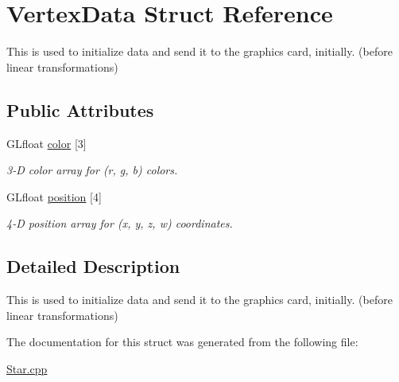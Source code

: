 \hypertarget{struct_vertex_data}{}\section{Vertex\+Data Struct Reference}
\label{struct_vertex_data}


This is used to initialize data and send it to the graphics card, initially. (before linear transformations)  


\subsection*{Public Attributes}
\begin{DoxyCompactItemize}
\item 
\mbox{\label{struct_vertex_data_a305475959e3c612d733b423f55f16709}} 
G\+Lfloat \hyperlink{struct_vertex_data_a305475959e3c612d733b423f55f16709}{color} \mbox{[}3\mbox{]}
\begin{DoxyCompactList}\small\item\em 3-\/D color array for (r, g, b) colors. \end{DoxyCompactList}\item 
\mbox{\label{struct_vertex_data_ad1ef7bb4d1a61dd585fe64f3167c31d6}} 
G\+Lfloat \hyperlink{struct_vertex_data_ad1ef7bb4d1a61dd585fe64f3167c31d6}{position} \mbox{[}4\mbox{]}
\begin{DoxyCompactList}\small\item\em 4-\/D position array for (x, y, z, w) coordinates. \end{DoxyCompactList}\end{DoxyCompactItemize}


\subsection{Detailed Description}
This is used to initialize data and send it to the graphics card, initially. (before linear transformations) 

The documentation for this struct was generated from the following file\+:\begin{DoxyCompactItemize}
\item 
\hyperlink{_star_8cpp}{Star.\+cpp}\end{DoxyCompactItemize}
